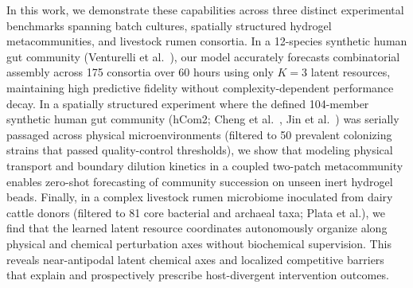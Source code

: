 In this work, we demonstrate these capabilities across three distinct experimental benchmarks spanning batch cultures, spatially structured hydrogel metacommunities, and livestock rumen consortia. In a 12-species synthetic human gut community (Venturelli et al.~\cite{venturelli2018deciphering}), our model accurately forecasts combinatorial assembly across 175 consortia over 60 hours using only $K=3$ latent resources, maintaining high predictive fidelity without complexity-dependent performance decay. In a spatially structured experiment where the defined 104-member synthetic human gut community (hCom2; Cheng et al.~\cite{cheng2022design}, Jin et al.~\cite{jin2023culturing}) was serially passaged across physical microenvironments (filtered to 50 prevalent colonizing strains that passed quality-control thresholds), we show that modeling physical transport and boundary dilution kinetics in a coupled two-patch metacommunity enables zero-shot forecasting of community succession on unseen inert hydrogel beads. Finally, in a complex livestock rumen microbiome inoculated from dairy cattle donors (filtered to 81 core bacterial and archaeal taxa; Plata et al.), we find that the learned latent resource coordinates autonomously organize along physical and chemical perturbation axes without biochemical supervision. This reveals near-antipodal latent chemical axes and localized competitive barriers that explain and prospectively prescribe host-divergent intervention outcomes.
